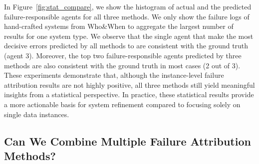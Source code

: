 In Figure~\ref{fig:stat_compare}, we show the histogram of actual and the predicted failure-responsible agents for all three methods. We only show the failure logs of hand-crafted systems from Who\&When to aggregate the largest number of results for one system type. 
We observe that the single agent that make the most decisive errors predicted by all methods to are consistent with the ground truth (agent 3). 
Moreover, the top two failure-responsible agents predicted by three methods are also consistent with the ground truth in most cases (2 out of 3).
These experiments demonstrate that, although the instance-level failure attribution results are not highly positive, all three methods still yield meaningful insights from a statistical perspective. In practice, these statistical results provide a more actionable basis for system refinement compared to focusing solely on single data instances.


\subsection{Can We Combine Multiple Failure Attribution Methods?}

\begin{table}[!htb]
\setlength{\tabcolsep}{1.2 pt} %
\caption{Comparison of the three failure attribution methods with a hybrid approach that combines all-at-once and step-by-step on the failure logs of hand-crafted systems from the Who\&When dataset. The hybrid method achieves the highest performance in both two metrics but incurs the highest token costs.}
\label{tab:hybrid}
\end{table}

